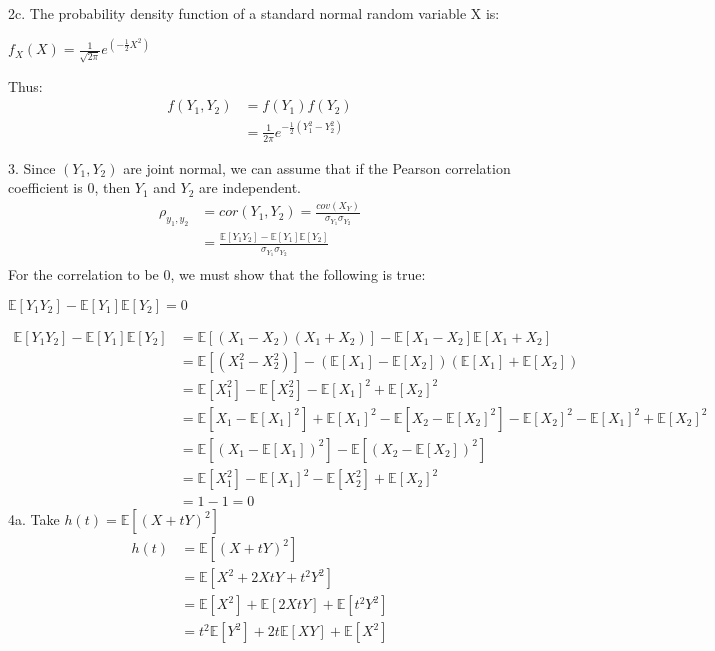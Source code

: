\documentclass[12pt]{article}
\begin{document}
2c. The probability density function of a standard normal random variable X is:
\begin{center}
$f_X(X) = \frac{1}{\sqrt{2\pi}}e^{(-\frac{1}{2}X^2)}$
\end{center}
Thus:
\begin{align} \nonumber
f(Y_1,Y_2) &= f(Y_1)f(Y_2) \\ \nonumber
&= \frac{1}{2\pi}e^{-\frac{1}{2}(Y_1^2-Y_2^2)}
\end{align}

\newpage

3. Since $(Y_1,Y_2)$ are joint normal, we can assume that if the Pearson correlation coefficient is 0, then $Y_1$ and $Y_2$ are independent.
\begin{align} \nonumber
\rho_{y_1,y_2} &= cor(Y_1,Y_2) = \frac{cov(X_Y)}{\sigma_{Y_1}\sigma_{Y_2}} \\ \nonumber
&= \frac{\mathbb{E}[Y_1Y_2] - \mathbb{E}[Y_1]\mathbb{E}[Y_2]}{\sigma_{Y_1}\sigma_{Y_2}} \\ \nonumber
\end{align}
For the correlation to be 0, we must show that the following is true:
\begin{center}
$\mathbb{E}[Y_1Y_2] - \mathbb{E}[Y_1]\mathbb{E}[Y_2] = 0$
\end{center}
\begin{align} \nonumber
\mathbb{E}[Y_1Y_2] - \mathbb{E}[Y_1]\mathbb{E}[Y_2] &= \mathbb{E}[(X_1 - X_2)(X_1+X_2)] - \mathbb{E}[X_1-X_2]\mathbb{E}[X_1+X_2] \\ \nonumber
&= \mathbb{E}[(X_1^2 -X_2^2)] - (\mathbb{E}[X_1]-\mathbb{E}[X_2])(\mathbb{E}[X_1]+\mathbb{E}[X_2]) \\ \nonumber
&= \mathbb{E}[X_1^2] - \mathbb{E}[X_2^2] - \mathbb{E}[X_1]^2 + \mathbb{E}[X_2]^2 \\ \nonumber
&= \mathbb{E}[X_1 - \mathbb{E}[X_1]^2] + \mathbb{E}[X_1]^2 - \mathbb{E}[X_2 - \mathbb{E}[X_2]^2] - \mathbb{E}[X_2]^2 - \mathbb{E}[X_1]^2 + \mathbb{E}[X_2]^2 \\ \nonumber
&= \mathbb{E}[(X_1 - \mathbb{E}[X_1])^2] - \mathbb{E}[(X_2 - \mathbb{E}[X_2])^2] \\ \nonumber
&= \mathbb{E}[X_1^2]-\mathbb{E}[X_1]^2 - \mathbb{E}[X_2^2]+\mathbb{E}[X_2]^2 \\ \nonumber
&= 1 - 1 = 0
\end{align}
4a. Take $h(t) = \mathbb{E}[(X+tY)^2]$
\begin{align} \nonumber
h(t) &= \mathbb{E}[(X+tY)^2] \\ \nonumber
&= \mathbb{E}[X^2+2XtY+t^2Y^2] \\ \nonumber
&= \mathbb{E}[X^2]+\mathbb{E}[2XtY]+\mathbb{E}[t^2Y^2] \\ \nonumber
&= t^2\mathbb{E}[Y^2] + 2t\mathbb{E}[XY] + \mathbb{E}[X^2]
\end{align}
\end{document}
